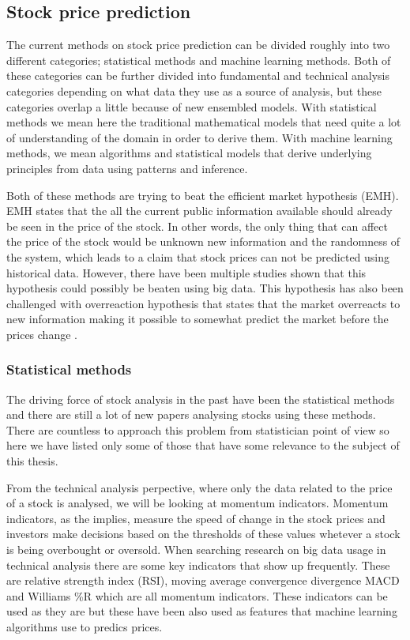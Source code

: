 \subsection{Stock price prediction}

The current methods on stock price prediction can be divided roughly into two different categories; statistical methods and machine learning methods.
Both of these categories can be further divided into fundamental and technical analysis categories depending on what data they use as a source of analysis, but these categories overlap a little because of new ensembled models.
With statistical methods we mean here the traditional mathematical models that need quite a lot of understanding of the domain in order to derive them.
With machine learning methods, we mean algorithms and statistical models that derive underlying principles from data using patterns and inference.

Both of these methods are trying to beat the efficient market hypothesis (EMH).
EMH states that the all the current public information available should already be seen in the price of the stock.
In other words, the only thing that can affect the price of the stock would be unknown new information and the randomness of the system, which leads to a claim that stock prices can not be predicted using historical data.
However, there have been multiple studies shown that this hypothesis could possibly be beaten using big data. \cite{nam}
This hypothesis has also been challenged with overreaction hypothesis that states that the market overreacts to new information making it possible to somewhat predict the market before the prices change \cite{day}.

\subsubsection{Statistical methods}

The driving force of stock analysis in the past have been the statistical methods and there are still a lot of new papers analysing stocks using these methods.
There are countless to approach this problem from statistician point of view so here we have listed only some of those that have some relevance to the subject of this thesis.

From the technical analysis perpective, where only the data related to the price of a stock is analysed, we will be looking at momentum indicators. \cite{utthammajai}
Momentum indicators, as the implies, measure the speed of change in the stock prices and investors make decisions based on the thresholds of these values whetever a stock is being overbought or oversold. \cite{james}
When searching research on big data usage in technical analysis there are some key indicators that show up frequently.
These are relative strength index (RSI), moving average convergence divergence MACD and Williams \%R which are all momentum indicators.
These indicators can be used as they are but these have been also used as features that machine learning algorithms use to predics prices. \cite{serez}

